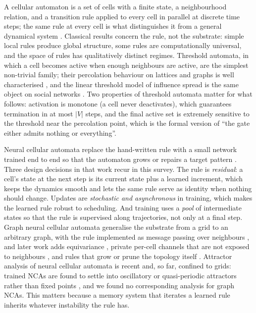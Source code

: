 \documentclass[11pt]{article}
\begin{document}
A cellular automaton is a set of cells with a finite state, a neighbourhood relation, and a transition rule applied to every cell in parallel at discrete time steps; the same rule at every cell is what distinguishes it from a general dynamical system \cite{wolfram1984}. Classical results concern the rule, not the substrate: simple local rules produce global structure, some rules are computationally universal, and the space of rules has qualitatively distinct regimes. Threshold automata, in which a cell becomes active when enough neighbours are active, are the simplest non-trivial family; their percolation behaviour on lattices and graphs is well characterised \cite{chalupa1979}, and the linear threshold model of influence spread is the same object on social networks \cite{kempe2003}. Two properties of threshold automata matter for what follows: activation is monotone (a cell never deactivates), which guarantees termination in at most $|V|$ steps, and the final active set is extremely sensitive to the threshold near the percolation point, which is the formal version of ``the gate either admits nothing or everything''.

Neural cellular automata replace the hand-written rule with a small network trained end to end so that the automaton grows or repairs a target pattern \cite{nca}. Three design decisions in that work recur in this survey. The rule is \emph{residual}: a cell's state at the next step is its current state plus a learned increment, which keeps the dynamics smooth and lets the same rule serve as identity when nothing should change. Updates are \emph{stochastic and asynchronous} in training, which makes the learned rule robust to scheduling. And training uses a \emph{pool} of intermediate states so that the rule is supervised along trajectories, not only at a final step. Graph neural cellular automata generalise the substrate from a grid to an arbitrary graph, with the rule implemented as message passing over neighbours \cite{gnca}, and later work adds equivariance \cite{egnca}, private per-cell channels that are not exposed to neighbours \cite{engramnca}, and rules that grow or prune the topology itself \cite{devgca}. Attractor analysis of neural cellular automata is recent and, so far, confined to grids: trained NCAs are found to settle into oscillatory or quasi-periodic attractors rather than fixed points \cite{nca-attractors,nca-landscape}, and we found no corresponding analysis for graph NCAs. This matters because a memory system that iterates a learned rule inherits whatever instability the rule has.
\end{document}
